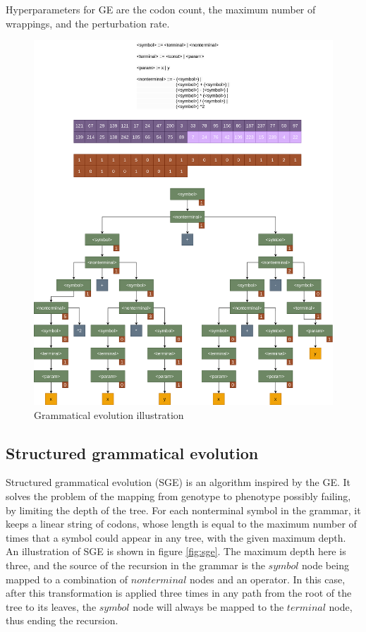 Hyperparameters for GE are the codon count, the maximum number of wrappings, and the perturbation rate.

\begin{figure}[!htbp]
	\centering
	\includegraphics[scale=0.19]{../images/ge.png}
	\caption{Grammatical evolution illustration}
    \label{fig:ge}
\end{figure}

\subsection{Structured grammatical evolution}

Structured grammatical evolution (SGE) \citep{sge} is an algorithm inspired by the GE. It solves the problem of the mapping from genotype to phenotype possibly failing, by limiting the depth of the tree. For each nonterminal symbol in the grammar, it keeps a linear string of codons, whose length is equal to the maximum number of times that a symbol could appear in any tree, with the given maximum depth. An illustration of SGE is shown in figure \ref{fig:sge}. The maximum depth here is three, and the source of the recursion in the grammar is the $symbol$ node being mapped to a combination of $nonterminal$ nodes and an operator. In this case, after this transformation is applied three times in any path from the root of the tree to its leaves, the $symbol$ node will always be mapped to the $terminal$ node, thus ending the recursion.

